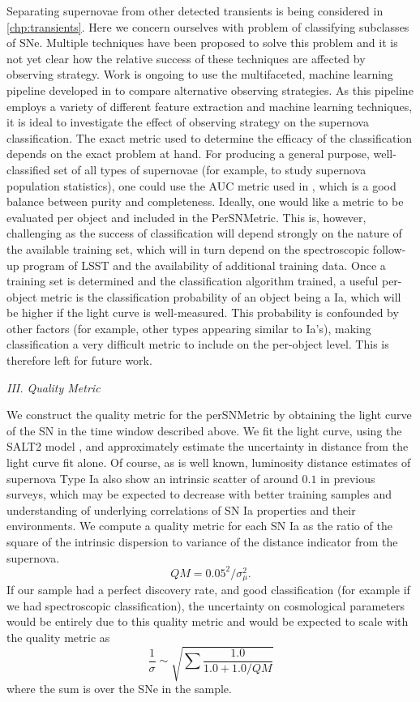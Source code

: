 Separating supernovae from other detected transients is being considered in
\autoref{chp:transients}. Here we concern ourselves with problem of classifying subclasses of
SNe. Multiple techniques have been proposed to solve this problem \citep{Frieman2008,sako2008, kessler2010b, 
ishida2012, sako2014} and it is not yet clear how the
relative success of these techniques are affected by observing strategy. Work is ongoing to use the
multifaceted, machine learning pipeline developed in \citet{Lochner2016} to compare alternative
observing strategies. As this pipeline employs a variety of different feature extraction and machine learning
techniques, it is ideal to investigate the effect of observing strategy on the supernova classification. The exact 
metric used to determine the efficacy of the classification depends
on the exact problem at hand. For producing a general purpose, well-classified set of all types of
supernovae (for example, to study supernova population statistics), one could use the AUC metric
used in \citet{Lochner2016}, which is a good balance between purity and completeness. Ideally,
one would like a metric to be evaluated per object and included in the PerSNMetric. This is,
however, challenging as the success of classification will depend strongly on the nature of the
available training set, which will in turn depend on the spectroscopic follow-up program of LSST
and the availability of additional training data. Once a training set is determined and the
classification algorithm trained, a useful per-object metric is the classification probability of an
object being a Ia, which will be higher if the light curve is well-measured. This probability is
confounded by other factors (for example, other types appearing similar to Ia's), making
classification a very difficult metric to include on the per-object level. This is therefore left for future work.


\emph{III. Quality Metric}

We construct the quality metric for the perSNMetric by obtaining the
light curve of the SN in the time window described above. We fit the
light curve, using the SALT2 model \citep{Guy2007,2014A&A...568A..22B}, and approximately estimate the uncertainty in
distance from
the light curve fit alone. Of course, as is well known, luminosity
distance estimates of supernova Type Ia also show an intrinsic scatter
of around $0.1$ in previous surveys, which may be expected to decrease
with better training samples and understanding of underlying
correlations of SN Ia properties and their environments. We compute a
quality metric for each SN Ia as the ratio of the square of the
intrinsic dispersion to variance of the distance indicator from the supernova. 
$$ QM = 0.05^2/\sigma^2_{\mu}.$$ If our sample had a perfect discovery rate, and good classification (for example if we had spectroscopic classification), the uncertainty on
cosmological parameters would be entirely due to this quality metric and would be expected to scale with the quality metric as 
$$\frac{1}{\sigma} \sim \sqrt{\sum{\frac{1.0}{1.0 + 1.0 / QM}}}$$
where the sum is over the SNe in the sample.

